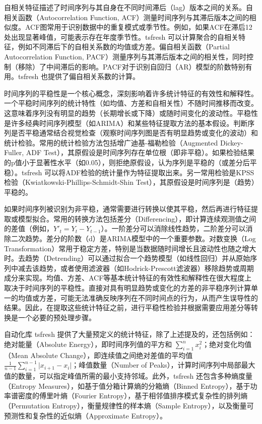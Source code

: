             自相关特征描述了时间序列与其自身在不同时间滞后（lag）版本之间的关系。自相关函数（Autocorrelation Function, ACF）测量时间序列与其滞后版本之间的相似度。ACF图常用于识别数据中的重复模式或季节性。例如，如果ACF在滞后12处出现显著峰值，可能表示存在年度季节性。tsfresh 可以计算聚合的自相关特征，例如不同滞后下的自相关系数的均值或方差。偏自相关函数（Partial Autocorrelation Function, PACF）测量序列与其滞后版本之间的相关性，同时控制（移除）了中间滞后的影响。PACF对于识别自回归（AR）模型的阶数特别有用。tsfresh 也提供了偏自相关系数的计算。

            时间序列的平稳性是一个核心概念，深刻影响着许多统计特征的有效性和解释性。一个平稳时间序列的统计特性（如均值、方差和自相关性）不随时间推移而改变。这意味着序列没有明显的趋势（长期增长或下降）或随时间变化的波动性。平稳性是许多经典时间序列模型（如ARIMA）和某些特征提取方法的基本假设。判断序列是否平稳通常结合视觉检查（观察时间序列图是否有明显趋势或变化的波动）和统计检验。常用的统计检验方法包括增广迪基-福勒检验（Augmented Dickey-Fuller, ADF Test），其原假设是时间序列存在单位根（即非平稳）。如果检验结果的p值小于显著性水平（如0.05），则拒绝原假设，认为序列是平稳的（或差分后平稳）。tsfresh 可以将ADF检验的统计量作为特征提取出来。另一常用检验是KPSS检验（Kwiatkowski-Phillips-Schmidt-Shin Test），其原假设是时间序列是（趋势）平稳的。

            如果时间序列被识别为非平稳，通常需要进行转换以使其平稳，然后再进行特征提取或模型拟合。常用的转换方法包括差分（Differencing），即计算连续观测值之间的差值（例如，$Y'_t = Y_t - Y_{t-1}$）。一阶差分可以消除线性趋势，二阶差分可以消除二次趋势。差分的阶数（d）是ARIMA模型中的一个重要参数。对数变换（Log Transformation）常用于稳定方差，特别是当数据随时间增长且波动性也随之增大时。去趋势（Detrending）可以通过拟合一个趋势模型（如线性回归）并从原始序列中减去该趋势，或者使用滤波器（如Hodrick-Prescott滤波器）移除趋势或周期成分来实现。均值、方差、ACF等基本统计特征的有效性和解释性在很大程度上取决于时间序列的平稳性。直接对具有明显趋势或变化的方差的非平稳序列计算单一的均值或方差，可能无法准确反映序列在不同时间点的行为，从而产生误导性的结果。因此，在提取这些统计特征之前，进行平稳性检验并根据需要应用差分等转换是一个必要的预处理步骤。

自动化库 tsfresh 提供了大量预定义的统计特征，除了上述提及的，还包括例如：绝对能量（Absolute Energy），即时间序列值的平方和 $\sum_{i=1}^{n} x_i^2$；绝对变化均值（Mean Absolute Change），即连续值之间绝对差值的平均值 $\frac{1}{n-1}\sum_{i=1}^{n-1} \lvert x_{i+1} - x_i \rvert$；峰值数量（Number of Peaks），计算时间序列中局部最大值的数量，可以指定峰值所需的最小支持邻域。此外，tsfresh 还包含多种熵度量（Entropy Measures），如基于值分箱计算熵的分箱熵（Binned Entropy），基于功率谱密度的傅里叶熵（Fourier Entropy），基于相邻值排序模式复杂性的排列熵（Permutation Entropy），衡量规律性的样本熵（Sample Entropy），以及衡量可预测性和复杂性的近似熵（Approximate Entropy）。

